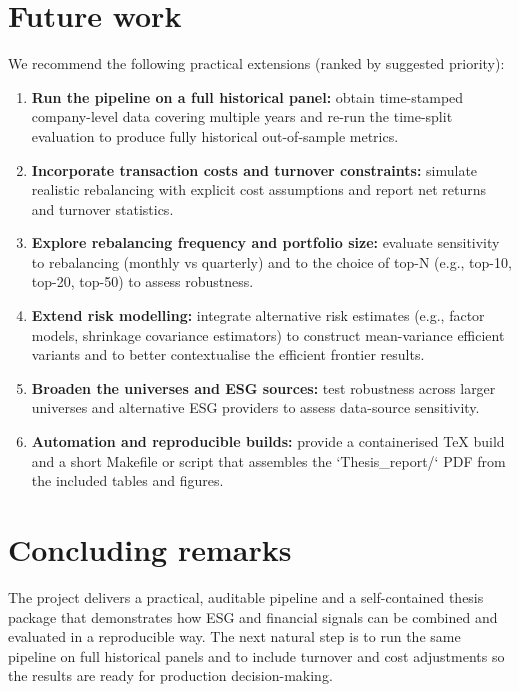 
\section{Future work}

We recommend the following practical extensions (ranked by suggested priority):

\begin{enumerate}
	\item \textbf{Run the pipeline on a full historical panel:} obtain time-stamped company-level data covering multiple years and re-run the time-split evaluation to produce fully historical out-of-sample metrics.
	\item \textbf{Incorporate transaction costs and turnover constraints:} simulate realistic rebalancing with explicit cost assumptions and report net returns and turnover statistics.
	\item \textbf{Explore rebalancing frequency and portfolio size:} evaluate sensitivity to rebalancing (monthly vs quarterly) and to the choice of top-N (e.g., top-10, top-20, top-50) to assess robustness.
	\item \textbf{Extend risk modelling:} integrate alternative risk estimates (e.g., factor models, shrinkage covariance estimators) to construct mean-variance efficient variants and to better contextualise the efficient frontier results.
	\item \textbf{Broaden the universes and ESG sources:} test robustness across larger universes and alternative ESG providers to assess data-source sensitivity.
	\item \textbf{Automation and reproducible builds:} provide a containerised TeX build and a short Makefile or script that assembles the `Thesis_report/` PDF from the included tables and figures.
\end{enumerate}


\section{Concluding remarks}

The project delivers a practical, auditable pipeline and a self-contained thesis package that demonstrates how ESG and financial signals can be combined and evaluated in a reproducible way. The next natural step is to run the same pipeline on full historical panels and to include turnover and cost adjustments so the results are ready for production decision-making.


